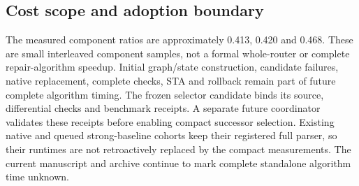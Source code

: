 \subsection{Cost scope and adoption boundary}
The measured component ratios are approximately 0.413, 0.420 and 0.468. These are small interleaved component samples, not a formal whole-router or complete repair-algorithm speedup. Initial graph/state construction, candidate failures, native replacement, complete checks, STA and rollback remain part of future complete algorithm timing. The frozen selector candidate binds its source, differential checks and benchmark receipts. A separate future coordinator validates these receipts before enabling compact successor selection. Existing native and queued strong-baseline cohorts keep their registered full parser, so their runtimes are not retroactively replaced by the compact measurements. The current manuscript and archive continue to mark complete standalone algorithm time unknown.
